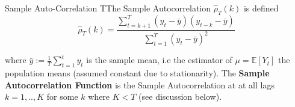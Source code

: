 \documentclass[openany]{tufte-book} %
\begin{document}
 \begin{mydef}{Sample Auto-Correlation } TThe Sample Autocorrelation $\hat{\rho}_T(k)$ is defined
\begin{equation*}
\hat{\rho}_T(k)=\dfrac{\sum_{t=k+1}^{T}\left( y_{t}-\bar{y}%
\right) \left( y_{t-k}-\bar{y}\right) }{\sum_{t=1}^{T}\left( y_{t}-\bar{y}%
\right) ^{2}}  \label{sample autocorr}
\end{equation*} \end{mydef}

where $\bar{y}:=\frac{1}{T} \sum_{t=1}^t y_t$ is the sample mean, i.e the estimator of $\mu=\mathbb{E}[Y_t]$ the population means (assumed constant due to stationarity). The \textbf{Sample Autocorrelation Function }is the Sample Autocorrelation at at all  lags $k=1,..,K$ for some $k$ where $K<T$ (see discussion below).\newline\vspace{0.2cm}
\end{document}

